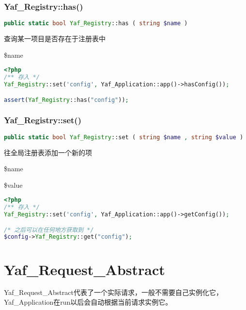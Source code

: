 \subsection{Yaf\_Registry::has()}



\begin{lstlisting}[language=PHP]
public static bool Yaf_Registry::has ( string $name )
\end{lstlisting}

查询某一项目是否存在于注册表中

\begin{compactitem}
\item \$name
\end{compactitem}

\begin{lstlisting}[language=PHP]
<?php
/** 存入 */
Yaf_Registry::set('config', Yaf_Application::app()->hasConfig());

assert(Yaf_Registry::has("config"));
\end{lstlisting}

\subsection{Yaf\_Registry::set()}


\begin{lstlisting}[language=PHP]
public static bool Yaf_Registry::set ( string $name , string $value )
\end{lstlisting}

往全局注册表添加一个新的项

\begin{compactitem}
\item \$name
\item \$value
\end{compactitem}

\begin{lstlisting}[language=PHP]
<?php
/** 存入 */
Yaf_Registry::set('config', Yaf_Application::app()->getConfig());

/* 之后可以在任何地方获取到 */
$config->Yaf_Registry::get("config");
\end{lstlisting}

\chapter{Yaf\_Request\_Abstract}

Yaf\_Request\_Abstract代表了一个实际请求，一般不需要自己实例化它，Yaf\_Application在run以后会自动根据当前请求实例它。

